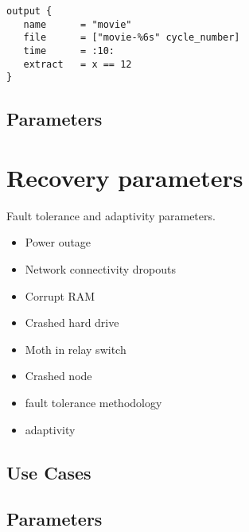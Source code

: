 \documentclass{book}
\begin{document}
\begin{verbatim}
output { 
   name      = "movie"
   file      = ["movie-%6s" cycle_number]
   time      = :10:
   extract   = x == 12
}
\end{verbatim}


\subsection{Parameters}

\section{Recovery parameters} \label{s:recovery}

Fault tolerance and adaptivity parameters.

\begin{itemize}
\item Power outage
\item Network connectivity dropouts
\item Corrupt RAM
\item Crashed hard drive
\item Moth in relay switch
\item Crashed node
\end{itemize}

\begin{itemize}
\item fault tolerance methodology
\item adaptivity
\end{itemize}

\subsection{Use Cases}
\subsection{Parameters}
\end{document}
